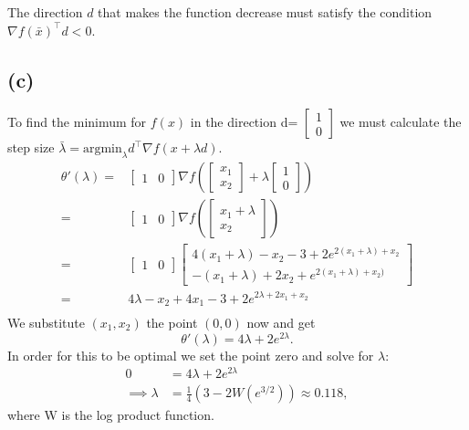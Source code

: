 \documentclass{article}
\begin{document}
	The direction $d$ that makes the function decrease must satisfy the condition $\nabla f(\bar{x})^\top d <0$.
\subsection*{(c)}
	To find the minimum for $f(x)$ in the direction d= $\begin{bmatrix}1 \\ 0\end{bmatrix}$ we must calculate the step size $\bar{\lambda}=\text{argmin}_{\lambda} d^\top \nabla f(x+ \lambda d)$. 
	\begin{align}
		\theta'(\lambda)= &\begin{bmatrix}
			1 & 0
		\end{bmatrix}
		\nabla f
		\left(\begin{bmatrix}
			x_1 \\
			x_2
		\end{bmatrix}+
		\lambda
		\begin{bmatrix}
			1 \\
			 0
		 \end{bmatrix}\right) \\
	=&
	 \begin{bmatrix}
	 	1 & 0
	 \end{bmatrix}
	 \nabla f\left(
	 \begin{bmatrix}
	 	x_1+\lambda \\
	 	x_2
	 \end{bmatrix}\right) \\
 	=&
	 \begin{bmatrix}
 		1 & 0
 	\end{bmatrix}
	\begin{bmatrix}
 		4(x_1+\lambda)-x_2 -3+ 2 e^{2 (x_1+\lambda) + x_2 } \\
 		-(x_1+\lambda)+2x_2 + e^{2(x_1+\lambda)+x_2)}
 	\end{bmatrix} \\
 	 =&
 		4\lambda-x_2 + 4x_1-3+ 2 e^{2\lambda + 2 x_1 + x_2 } \\
	\end{align}
	We substitute $(x_1,x_2)$ the point $(0,0)$ now and get
	\begin{equation}
		\theta'(\lambda)= 4\lambda +2 e^{2\lambda}.
	\end{equation}
	In order for this to be optimal we set the point zero and solve for $\lambda$:
	\begin{align}
		0 &= 4 \lambda + 2e^{2\lambda}\\
		\implies \lambda &= \frac{1}{4} (3 - 2 W(e^{3/2})) \approx 0.118,
	\end{align}
	where W is the log product function.
	
\end{document}
